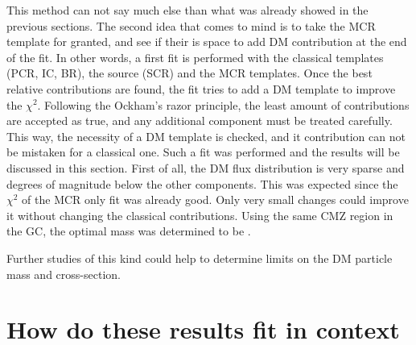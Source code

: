 This method can not say much else than what was already showed in the previous sections. The second idea that comes to mind is to take the MCR template for granted, and see if their is space to add DM contribution at the end of the fit. In other words, a first fit is performed with the classical templates (PCR, IC, BR), the source (SCR) and the MCR templates. Once the best relative contributions are found, the fit tries to add a DM template to improve the $\chi^2$.
Following the Ockham's razor principle, the least amount of contributions are accepted as true, and any additional component must be treated carefully. This way, the necessity of a DM template is checked, and it contribution can not be mistaken for a classical one.
Such a fit was performed and the results will be discussed in this section. First of all, the DM flux distribution  is very sparse and degrees of magnitude below the other components. This was expected since the $\chi^2$ of the MCR only fit was already good. Only very small changes could improve it without changing the classical contributions. Using the same CMZ region in the GC, the optimal mass was determined to be .

Further studies of this kind could help to determine limits on the DM particle mass and cross-section.


\section{How do these results fit in context}
%		



